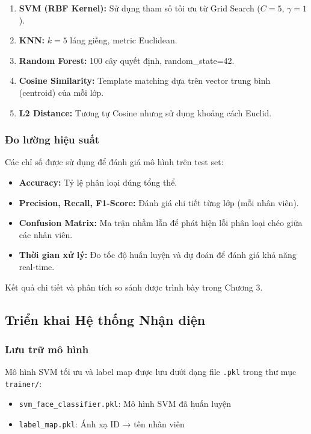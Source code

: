 \documentclass[a4paper]{book}
\begin{document}
\begin{enumerate}
    \item \textbf{SVM (RBF Kernel):} Sử dụng tham số tối ưu từ Grid Search ($C=5$, $\gamma=1$).
    \item \textbf{KNN:} $k=5$ láng giềng, metric Euclidean.
    \item \textbf{Random Forest:} 100 cây quyết định, random\_state=42.
    \item \textbf{Cosine Similarity:} Template matching dựa trên vector trung bình (centroid) của mỗi lớp.
    \item \textbf{L2 Distance:} Tương tự Cosine nhưng sử dụng khoảng cách Euclid.
\end{enumerate}

\subsubsection{Đo lường hiệu suất}
Các chỉ số được sử dụng để đánh giá mô hình trên test set:

\begin{itemize}
    \item \textbf{Accuracy:} Tỷ lệ phân loại đúng tổng thể.
    \item \textbf{Precision, Recall, F1-Score:} Đánh giá chi tiết từng lớp (mỗi nhân viên).
    \item \textbf{Confusion Matrix:} Ma trận nhầm lẫn để phát hiện lỗi phân loại chéo giữa các nhân viên.
    \item \textbf{Thời gian xử lý:} Đo tốc độ huấn luyện và dự đoán để đánh giá khả năng real-time.
\end{itemize}

Kết quả chi tiết và phân tích so sánh được trình bày trong Chương 3.

\subsection{Triển khai Hệ thống Nhận diện}

\subsubsection{Lưu trữ mô hình}
Mô hình SVM tối ưu và label map được lưu dưới dạng file \texttt{.pkl} trong thư mục \texttt{trainer/}:
\begin{itemize}
    \item \texttt{svm\_face\_classifier.pkl}: Mô hình SVM đã huấn luyện
    \item \texttt{label\_map.pkl}: Ánh xạ ID → tên nhân viên
\end{itemize}
\end{document}
